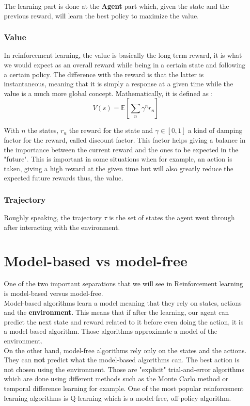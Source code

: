 \documentclass[a4paper,12pt,calibri,oneside,openany]{book}
\theoremstyle{break}
\begin{document}
The learning part is done at the \textbf{Agent} part which, given the state and the previous reward, will learn the best policy to maximize the value.
\subsubsection{Value}
\qquad In reinforcement learning, the value is basically the long term reward, it is what we would expect as an overall reward while being in a certain state and following a certain policy. The difference with the reward is that the latter is instantaneous, meaning that it is simply a response at a given time while the value is a much more global concept. Mathematically, it is defined as :
$$
V(s)=\mathbb{E}\left[\sum_{n}\gamma^n r_n\right]
$$

With $n$ the states, $r_n$ the reward for the state and $\gamma\in[0,1]$ a kind of damping factor for the reward, called discount factor. This factor helps giving a balance in the importance between the current reward and the ones to be expected in the "future". This is important in some situations when for example, an action is taken, giving a high reward at the given time but will also greatly reduce the expected future rewards thus, the value.
\subsubsection{Trajectory}
\qquad Roughly speaking, the trajectory $\tau$ is the set of states the agent went through after interacting with the environment.
\section{Model-based vs model-free}
One of the two important separations that we will see in Reinforcement learning is model-based versus model-free.\\

 Model-based algorithms learn a model meaning that they rely on states, actions and the \textbf{environment}. This means that if after the learning, our agent can predict the next state and reward related to it before even doing the action, it is a model-based algorithm. Those algorithms approximate a model of the environment. \\

On the other hand, model-free algorithms rely only on the states and the actions. They can \textbf{not} predict what the model-based algorithms can. The best action is not chosen using the environment. Those are "explicit" trial-and-error algorithms which are done using different methods such as the Monte Carlo method or temporal difference learning for example. One of the most popular reinforcement learning algorithms is Q-learning which is a model-free, off-policy algorithm.
\end{document}
